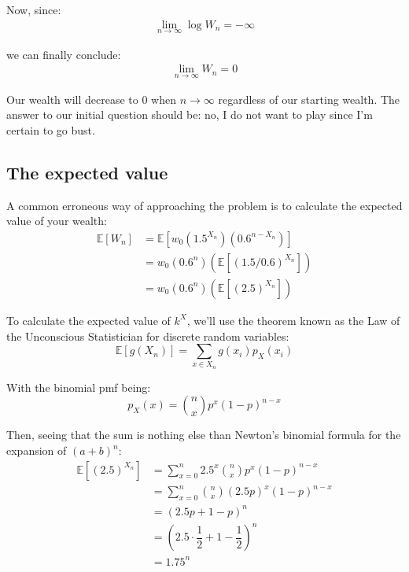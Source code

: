 \documentclass[12pt]{article}
\begin{document}
Now, since:
\begin{align*}
    \begin{equation*}
        \lim_{n\to\infty} \log{W_n} = -\infty
    \end{equation*}    
\end{align*}

we can finally conclude:
\begin{align}
    \begin{equation*}
        \lim_{n\to\infty} {W_n} = 0
    \end{equation*}    
\end{align}

Our wealth will decrease to 0 when $n\to\infty$ regardless of our starting wealth. The answer to our initial question should be: no, I do not want to play since I'm certain to go bust.

\subsection{The expected value}
A common erroneous way of approaching the problem is to calculate the expected value of your wealth:
\begin{equation*}
  \begin{split}
    \mathbb{E}[W_n] &= \mathbb{E}[w_0 \left(1.5^{X_n}\right) \left(0.6^{n-X_n}\right)]\\
    & = w_0  \left(0.6^n\right) \left(\mathbb{E}[(1.5/0.6)^{X_n}]\right)\\
    & = w_0 \left(0.6^n\right) \left(\mathbb{E}[(2.5)^{X_n}]\right)
  \end{split}
\end{equation*}

To calculate the expected value of $k^X$, we'll use the theorem known as the Law of the Unconscious Statistician for discrete random variables:
\begin{equation}
    \mathbb{E}[g(X_n)] = \sum\limits_{x \in X_n} g(x_i) p_X(x_i)
\end{equation}

With the binomial pmf being:
\begin{equation}
    p_X(x) = {n \choose x} p^x (1-p)^{n-x}
\end{equation}

Then, seeing that the sum is nothing else than Newton's binomial formula for the expansion of $(a+b)^n$:
\begin{equation*}
  \begin{split}
    \mathbb{E}[(2.5)^{X_n}] &= \sum\limits_{x=0}^{n} 2.5^x {n \choose x} p^x (1-p)^{n-x}\\
    &= \sum\limits_{x=0}^{n} {n \choose x} (2.5p)^x (1-p)^{n-x}\\
    &= (2.5p + 1 - p)^n \\ 
    &= (2.5 \cdot \dfrac{1}{2} + 1 - \dfrac{1}{2})^n\\
    & = 1.75^n
  \end{split}
\end{equation*}
\end{document}
